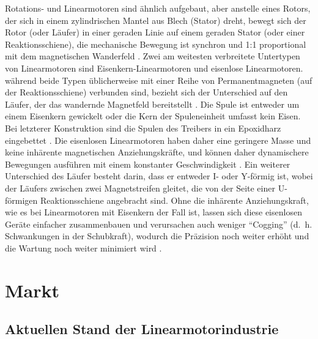 \documentclass[
  oneside]{book}
\begin{document}
Rotations- und Linearmotoren sind ähnlich aufgebaut, aber anstelle eines Rotors, der sich in einem zylindrischen Mantel aus Blech (Stator) dreht, bewegt sich der Rotor (oder Läufer) in einer geraden Linie auf einem geraden Stator (oder einer Reaktionsschiene), die mechanische Bewegung ist synchron und 1:1 proportional mit dem magnetischen Wanderfeld \citep{gieras2018}. Zwei am weitesten verbreitete Untertypen von Linearmotoren sind Eisenkern-Linearmotoren und eisenlose Linearmotoren. während beide Typen üblicherweise mit einer Reihe von Permanentmagneten (auf der Reaktionsschiene) verbunden sind, bezieht sich der Unterschied auf den Läufer, der das wandernde Magnetfeld bereitstellt \citep{chou2016, gieras2018}. Die Spule ist entweder um einem Eisenkern gewickelt oder die Kern der Spuleneinheit umfasst kein Eisen. Bei letzterer Konstruktion sind die Spulen des Treibers in ein Epoxidharz eingebettet \citep{collins2016, gieras2018}. Die eisenlosen Linearmotoren haben daher eine geringere Masse und keine inhärente magnetischen Anziehungskräfte, und können daher dynamischere Bewegungen ausführen mit einem konstanter Geschwindigkeit \citep[0,01\% Geschwindigkeitsvariation][]{collins2016}. Ein weiterer Unterschied des Läufer besteht darin, dass er entweder I- oder Y-förmig ist, wobei der Läufers zwischen zwei Magnetstreifen gleitet, die von der Seite einer U-förmigen Reaktionsschiene angebracht sind. Ohne die inhärente Anziehungskraft, wie es bei Linearmotoren mit Eisenkern der Fall ist, lassen sich diese eisenlosen Geräte einfacher zusammenbauen und verursachen auch weniger ``Cogging'' (d.~h. Schwankungen in der Schubkraft), wodurch die Präzision noch weiter erhöht und die Wartung noch weiter minimiert wird \citep{collins2016} .

\hypertarget{markt}{%
\section{Markt}\label{markt}}

\hypertarget{aktuellen-stand-der-linearmotorindustrie}{%
\subsection{Aktuellen Stand der Linearmotorindustrie}\label{aktuellen-stand-der-linearmotorindustrie}}
\end{document}
